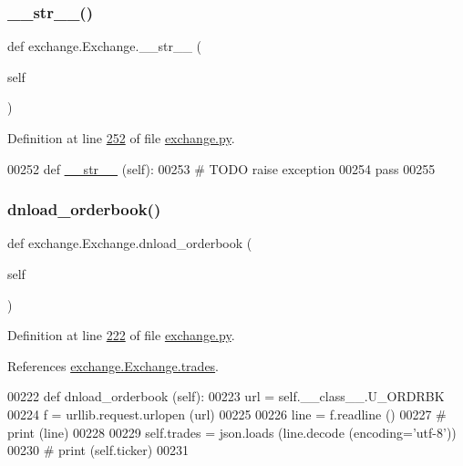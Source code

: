 \subsubsection{\texorpdfstring{\+\_\+\+\_\+str\+\_\+\+\_\+()}{\_\_str\_\_()}}
{\footnotesize\ttfamily def exchange.\+Exchange.\+\_\+\+\_\+str\+\_\+\+\_\+ (\begin{DoxyParamCaption}\item[{}]{self }\end{DoxyParamCaption})}



Definition at line \hyperlink{exchange_8py_source_l00252}{252} of file \hyperlink{exchange_8py_source}{exchange.\+py}.


\begin{DoxyCode}
00252     \textcolor{keyword}{def }\hyperlink{namespacerates_a2f1a70c33ee9e255938e4c19fd207264}{\_\_str\_\_} (self):
00253         \textcolor{comment}{# TODO raise exception}
00254         \textcolor{keywordflow}{pass}
00255         
\end{DoxyCode}
\mbox{\label{classexchange_1_1_exchange_a99f32c746467a00b455a97c7805fd710}} 
\subsubsection{\texorpdfstring{dnload\+\_\+orderbook()}{dnload\_orderbook()}}
{\footnotesize\ttfamily def exchange.\+Exchange.\+dnload\+\_\+orderbook (\begin{DoxyParamCaption}\item[{}]{self }\end{DoxyParamCaption})}



Definition at line \hyperlink{exchange_8py_source_l00222}{222} of file \hyperlink{exchange_8py_source}{exchange.\+py}.



References \hyperlink{exchange_8py_source_l00211}{exchange.\+Exchange.\+trades}.


\begin{DoxyCode}
00222     \textcolor{keyword}{def }dnload\_orderbook (self):
00223         url = self.\_\_class\_\_.U\_ORDRBK
00224         f = urllib.request.urlopen (url)
00225         
00226         line = f.readline ()
00227 \textcolor{comment}{#        print (line)}
00228         
00229         self.trades = json.loads (line.decode (encoding=\textcolor{stringliteral}{'utf-8'}))
00230 \textcolor{comment}{#        print (self.ticker)}
00231         
\end{DoxyCode}
\mbox{\label{classexchange_1_1_exchange_a9e700d31fd60de495956518436b6768a}} 

